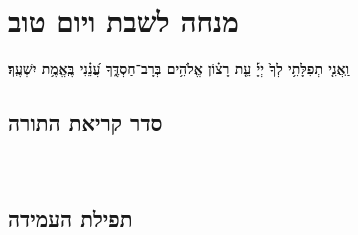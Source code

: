 \documentclass[twoside, openany, parskip=half, 11pt]{book}
\begin{document}
%
\blankpage
\chapter[מנחה לשבת ויו״ט]{ מנחה לשבת ויום טוב }
\tamid

\ketoret
\sepline
\ashrei

\uvaletzion

\halfkaddish


\textbf{וַֽאֲנִ֤י תְפִלָּתִ֥י לְךָ֙ יְיָ֡ עֵ֤ת רָצ֗וֹן אֱלֹהִ֥ים בְּרָב־חַסְדֶּ֑ךָ עֲ֝נֵ֗נִי בֶּֽאֱמֶ֥ת יִשְׁעֶֽךָ׃} 


\section*{ סדר קריאת התורה }


\pesicha

\brikhshmei

\gadlu

\avharachamim

\vesigale


\torahbarachu

\hagomel

\nextpage
\hagbaha

\yehalelu

\\
\kafdalet

\nextpage
\etzchaim

\label{shabYTamidah}
\halfkaddish

\section*{ תפילת העמידה }


\amidaopening{\shabbosshuva}{}


\end{document}
